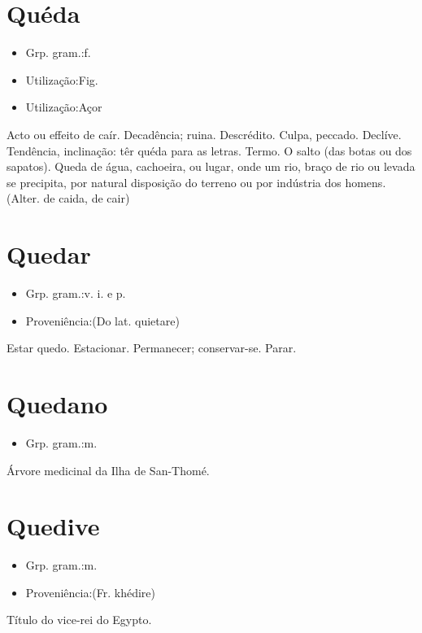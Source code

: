 \section{Quéda}
\begin{itemize}
\item {Grp. gram.:f.}
\end{itemize}
\begin{itemize}
\item {Utilização:Fig.}
\end{itemize}
\begin{itemize}
\item {Utilização:Açor}
\end{itemize}
Acto ou effeito de caír.
Decadência; ruina.
Descrédito.
Culpa, peccado.
Declíve.
Tendência, inclinação: \textunderscore têr quéda para as letras\textunderscore .
Termo.
O salto (das botas ou dos sapatos).
\textunderscore Queda de água\textunderscore , cachoeira, ou lugar, onde um rio, braço de rio ou levada se precipita, por natural disposição do terreno ou por indústria dos homens.
(Alter. de \textunderscore caida\textunderscore , de \textunderscore cair\textunderscore )
\section{Quedar}
\begin{itemize}
\item {Grp. gram.:v. i.  e  p.}
\end{itemize}
\begin{itemize}
\item {Proveniência:(Do lat. \textunderscore quietare\textunderscore )}
\end{itemize}
Estar quedo.
Estacionar.
Permanecer; conservar-se.
Parar.
\section{Quedano}
\begin{itemize}
\item {Grp. gram.:m.}
\end{itemize}
Árvore medicinal da Ilha de San-Thomé.
\section{Quedive}
\begin{itemize}
\item {Grp. gram.:m.}
\end{itemize}
\begin{itemize}
\item {Proveniência:(Fr. \textunderscore khédire\textunderscore )}
\end{itemize}
Título do vice-rei do Egypto.
